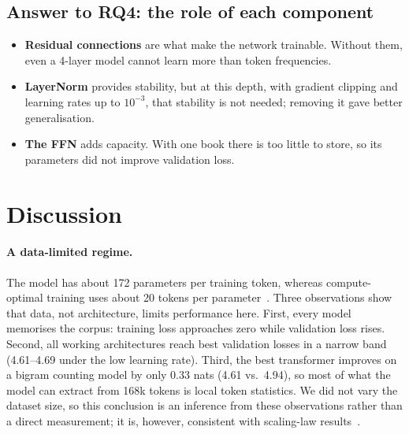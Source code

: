 \documentclass[11pt,a4paper]{article}
\begin{document}
\subsection{Answer to RQ4: the role of each component}

\begin{itemize}[leftmargin=*]
  \item \textbf{Residual connections} are what make the network trainable. Without them, even a 4-layer model cannot learn more than token frequencies.
  \item \textbf{LayerNorm} provides stability, but at this depth, with gradient clipping and learning rates up to $10^{-3}$, that stability is not needed; removing it gave better generalisation.
  \item \textbf{The FFN} adds capacity. With one book there is too little to store, so its parameters did not improve validation loss.
\end{itemize}

\section{Discussion}\label{sec:discussion}

\paragraph{A data-limited regime.} The model has about 172 parameters per training token, whereas compute-optimal training uses about 20 tokens per parameter~\cite{hoffmann2022chinchilla}. Three observations show that data, not architecture, limits performance here. First, every model memorises the corpus: training loss approaches zero while validation loss rises. Second, all working architectures reach best validation losses in a narrow band (4.61--4.69 under the low learning rate). Third, the best transformer improves on a bigram counting model by only 0.33 nats (4.61 vs.\ 4.94), so most of what the model can extract from 168k tokens is local token statistics. We did not vary the dataset size, so this conclusion is an inference from these observations rather than a direct measurement; it is, however, consistent with scaling-law results~\cite{kaplan2020scaling,hoffmann2022chinchilla}.
\end{document}
